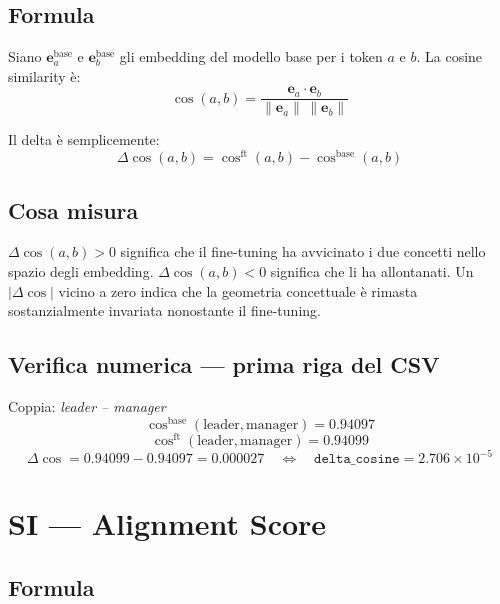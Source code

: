\documentclass[12pt, a4paper]{article}
\begin{document}
\subsection{Formula}

Siano $\mathbf{e}^{\mathrm{base}}_a$ e $\mathbf{e}^{\mathrm{base}}_b$ gli embedding
del modello base per i token $a$ e $b$. La cosine similarity è:
\begin{equation}
    \cos(a, b) = \frac{\mathbf{e}_a \cdot \mathbf{e}_b}{\|\mathbf{e}_a\|\,\|\mathbf{e}_b\|}
    \label{eq:cosine}
\end{equation}

Il delta è semplicemente:
\begin{equation}
    \Delta\cos(a,b) = \cos^{\mathrm{ft}}(a,b) - \cos^{\mathrm{base}}(a,b)
    \label{eq:delta_cosine}
\end{equation}

\subsection{Cosa misura}

$\Delta\cos(a,b) > 0$ significa che il fine-tuning ha avvicinato i due concetti
nello spazio degli embedding. $\Delta\cos(a,b) < 0$ significa che li ha allontanati.
Un $|\Delta\cos|$ vicino a zero indica che la geometria concettuale è rimasta
sostanzialmente invariata nonostante il fine-tuning.

\subsection{Verifica numerica — prima riga del CSV}

Coppia: \textit{leader -- manager}
\[
\cos^{\mathrm{base}}(\text{leader}, \text{manager}) = 0.94097
\]
\[
\cos^{\mathrm{ft}}(\text{leader}, \text{manager}) = 0.94099
\]
\[
\Delta\cos = 0.94099 - 0.94097 = 0.000027 \quad \Longleftrightarrow \quad
\texttt{delta\_cosine} = 2.706 \times 10^{-5}
\]

\section{SI — Alignment Score}

\subsection{Formula}
\end{document}
